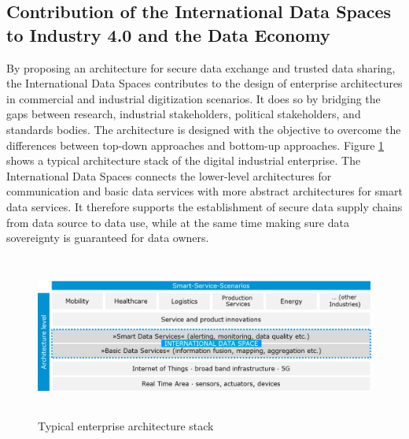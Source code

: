 

\subsection{Contribution of the International Data Spaces to Industry 4.0 and the Data Economy}\label{subsec:contribution_to_industry40}
By proposing an architecture for secure data exchange and trusted data sharing, the International Data Spaces contributes to the design of enterprise architectures in commercial and industrial digitization scenarios. It does so by bridging the gaps between research, industrial stakeholders, political stakeholders, and standards bodies. The architecture is designed with the objective to overcome the differences between top-down approaches and bottom-up approaches. Figure \ref{fig:5_Typical_enterprise_architecture_stack} shows a typical architecture stack of the digital industrial enterprise. The International Data Spaces connects the lower-level architectures for communication and basic data services with more abstract architectures for smart data services. It therefore supports the establishment of secure data supply chains from data source to data use, while at the same time making sure data sovereignty is guaranteed for data owners.




\begin{figure}[h]
	\begin{Center}
		\includegraphics[width=6.25in,height=2.09in]{./media/image16.png}
		\caption{ Typical enterprise architecture stack}
		\label{fig:5_Typical_enterprise_architecture_stack}
	\end{Center}
\end{figure}





